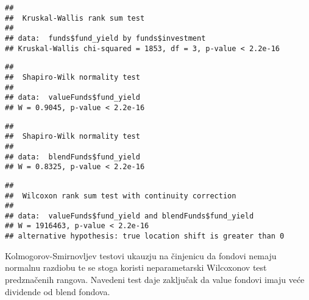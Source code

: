 \documentclass[
]{article}
\newenvironment{Shaded}{\begin{snugshade}}{\end{snugshade}}
\newcommand{\CommentTok}[1]{\textcolor[rgb]{0.56,0.35,0.01}{\textit{#1}}}
\newcommand{\DataTypeTok}[1]{\textcolor[rgb]{0.13,0.29,0.53}{#1}}
\newcommand{\KeywordTok}[1]{\textcolor[rgb]{0.13,0.29,0.53}{\textbf{#1}}}
\newcommand{\NormalTok}[1]{#1}
\newcommand{\OperatorTok}[1]{\textcolor[rgb]{0.81,0.36,0.00}{\textbf{#1}}}
\newcommand{\OtherTok}[1]{\textcolor[rgb]{0.56,0.35,0.01}{#1}}
\newcommand{\StringTok}[1]{\textcolor[rgb]{0.31,0.60,0.02}{#1}}
\begin{document}
\begin{verbatim}
## 
##  Kruskal-Wallis rank sum test
## 
## data:  funds$fund_yield by funds$investment
## Kruskal-Wallis chi-squared = 1853, df = 3, p-value < 2.2e-16
\end{verbatim}

\begin{Shaded}
\end{Shaded}

\begin{verbatim}
## 
##  Shapiro-Wilk normality test
## 
## data:  valueFunds$fund_yield
## W = 0.9045, p-value < 2.2e-16
\end{verbatim}

\begin{Shaded}
\end{Shaded}

\begin{verbatim}
## 
##  Shapiro-Wilk normality test
## 
## data:  blendFunds$fund_yield
## W = 0.8325, p-value < 2.2e-16
\end{verbatim}

\begin{Shaded}
\end{Shaded}

\begin{verbatim}
## 
##  Wilcoxon rank sum test with continuity correction
## 
## data:  valueFunds$fund_yield and blendFunds$fund_yield
## W = 1916463, p-value < 2.2e-16
## alternative hypothesis: true location shift is greater than 0
\end{verbatim}

Kolmogorov-Smirnovljev testovi ukauzju na činjenicu da fondovi nemaju
normalnu razdiobu te se stoga koristi neparametarski Wilcoxonov test
predznačenih rangova. Navedeni test daje zaključak da value fondovi
imaju veće dividende od blend fondova.
\end{document}
